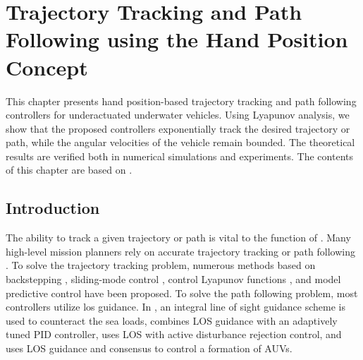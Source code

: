 \chapter{Trajectory Tracking and Path Following using the Hand Position Concept}
\label{chap:handpos_trajectory}

\newcommand{\citeexistingmethods}{\cite{rezazadegan_trajectory-tracking-backstepping_2015,alonge_trajectory-tracking-backstepping_2001,elmokadem_trajectory-tracking-SMC_2016,aguiar_trajectory-tracking-CLF_2007,abdelaal_trajectory-tracking-MPC_2015,caharija_path-following-ILOS_2016,xiang_path-following-robust_2017,miao_path-following-curvilinear_2017,borhaug_straight_2007}}

This chapter presents hand position-based trajectory tracking and path following controllers for underactuated underwater vehicles.
Using Lyapunov analysis, we show that the proposed controllers exponentially track the desired trajectory or path, while the angular velocities of the vehicle remain bounded.
The theoretical results are verified both in numerical simulations and experiments.
The contents of this chapter are based on \cite{matous_trajectory_2023}.

\section{Introduction}

The ability to track a given trajectory or path is vital to the function of .
Many high-level mission planners rely on accurate trajectory tracking or path following \cite{mcgann_trex_2007}.
To solve the trajectory tracking problem, numerous methods based on backstepping \cite{rezazadegan_trajectory-tracking-backstepping_2015,alonge_trajectory-tracking-backstepping_2001}, sliding-mode control \cite{elmokadem_trajectory-tracking-SMC_2016}, control Lyapunov functions \cite{aguiar_trajectory-tracking-CLF_2007}, and model predictive control \cite{abdelaal_trajectory-tracking-MPC_2015} have been proposed.    
To solve the path following problem, most controllers utilize \acrfull{los} guidance.
In \cite{caharija_path-following-ILOS_2016}, an integral line of sight guidance scheme is used to counteract the sea loads, \cite{xiang_path-following-robust_2017} combines LOS guidance with an adaptively tuned PID controller, \cite{miao_path-following-curvilinear_2017} uses LOS with active disturbance rejection control, and \cite{borhaug_straight_2007} uses LOS guidance and consensus to control a formation of AUVs.


